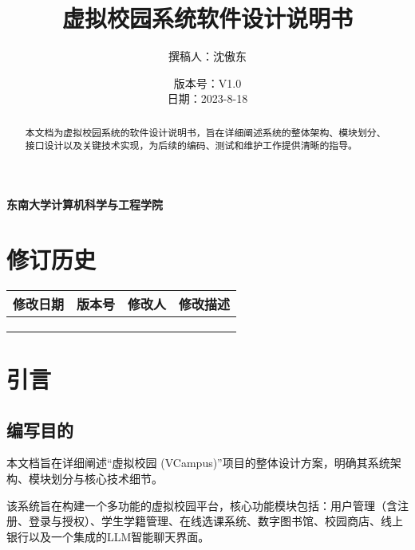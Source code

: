 \documentclass[a4paper]{ctexart}
\title{\bfseries 虚拟校园系统软件设计说明书}
\author{撰稿人：沈傲东}
\date{
    版本号：V1.0 \\
    \vspace{0.5em}
    日\quad 期：2023-8-18
}
\begin{document}
\maketitle
\begin{center}
    \vspace{1.5cm}
    \Large \bfseries 东南大学计算机科学与工程学院
    \vspace{2cm}
\end{center}

\begin{abstract}
    \noindent 本文档为虚拟校园系统的软件设计说明书，旨在详细阐述系统的整体架构、模块划分、接口设计以及关键技术实现，为后续的编码、测试和维护工作提供清晰的指导。
\end{abstract}

\newpage

\section*{修订历史}
\begin{tabular}{p{} p{} p{} p{}}
    \toprule
    \textbf{修改日期} & \textbf{版本号} & \textbf{修改人} & \textbf{修改描述} \\
    \midrule
                  &              &              &               \\
                  &              &              &               \\
                  &              &              &               \\
    \bottomrule
\end{tabular}

\newpage

\tableofcontents
\newpage


\section{引言}

\subsection{编写目的}
本文档旨在详细阐述“虚拟校园 (VCampus)”项目的整体设计方案，明确其系统架构、模块划分与核心技术细节。

该系统旨在构建一个多功能的虚拟校园平台，核心功能模块包括：用户管理（含注册、登录与授权）、学生学籍管理、在线选课系统、数字图书馆、校园商店、线上银行以及一个集成的LLM智能聊天界面。
\end{document}
